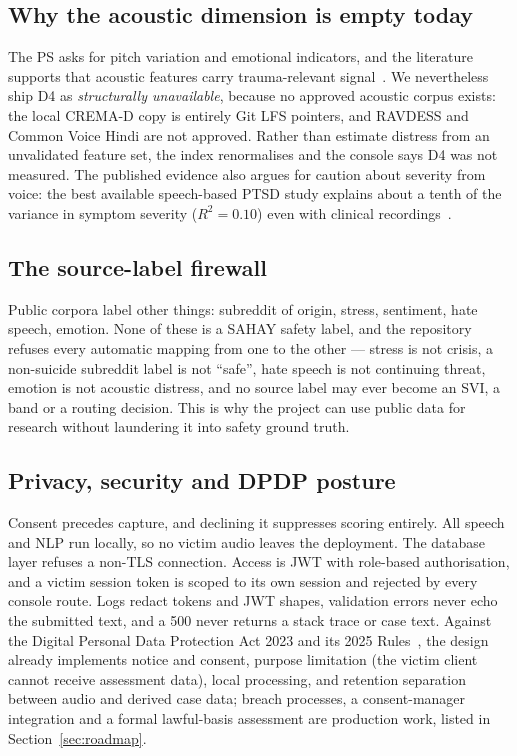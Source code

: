 \documentclass[11pt,a4paper]{article}
\begin{document}
\subsection{Why the acoustic dimension is empty today}
\label{sec:d4}
The PS asks for pitch variation and emotional indicators, and the literature supports that acoustic
features carry trauma-relevant signal~\cite{hu2024,islam2024}. We nevertheless ship D4 as
\emph{structurally unavailable}, because no approved acoustic corpus exists: the local CREMA-D copy
is entirely Git LFS pointers, and RAVDESS and Common Voice Hindi are not approved. Rather than
estimate distress from an unvalidated feature set, the index renormalises and the console says D4 was
not measured. The published evidence also argues for caution about severity from voice: the best
available speech-based PTSD study explains about a tenth of the variance in symptom severity
($R^2 = 0.10$) even with clinical recordings~\cite{hu2024}.

\subsection{The source-label firewall}
\label{sec:firewall}
Public corpora label other things: subreddit of origin, stress, sentiment, hate speech, emotion. None
of these is a SAHAY safety label, and the repository refuses every automatic mapping from one to the
other --- stress is not crisis, a non-suicide subreddit label is not ``safe'', hate speech is not
continuing threat, emotion is not acoustic distress, and no source label may ever become an SVI, a
band or a routing decision. This is why the project can use public data for research without
laundering it into safety ground truth.

\subsection{Privacy, security and DPDP posture}
\label{sec:privacy}
Consent precedes capture, and declining it suppresses scoring entirely. All speech and NLP run
locally, so no victim audio leaves the deployment. The database layer refuses a non-TLS connection.
Access is JWT with role-based authorisation, and a victim session token is scoped to its own session
and rejected by every console route. Logs redact tokens and JWT shapes, validation errors never echo
the submitted text, and a 500 never returns a stack trace or case text. Against the Digital Personal
Data Protection Act 2023 and its 2025 Rules~\cite{meity2023}, the design already implements notice
and consent, purpose limitation (the victim client cannot receive assessment data), local processing,
and retention separation between audio and derived case data; breach processes, a consent-manager
integration and a formal lawful-basis assessment are production work, listed in
Section~\ref{sec:roadmap}.
\end{document}
